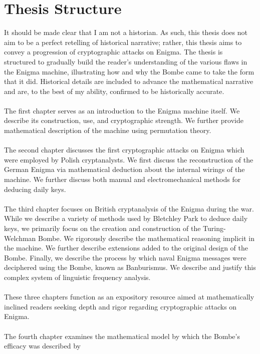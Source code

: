 \documentclass{dcthesis}
\theoremstyle{definition}
\theoremstyle{remark}
\begin{document}
\chapter*{Thesis Structure}
It should be made clear that I am not a historian. As such, this
thesis does not aim to be a perfect retelling of historical
narrative; rather, this thesis aims to convey a
progression of cryptographic attacks on Enigma. The thesis is
structured to gradually build the reader's
understanding of the various flaws in the Enigma machine,
illustrating how and why the Bombe came to take the form that it did.
Historical details are included to advance the mathematical narrative
and are, to the best of my ability, confirmed to be historically accurate.
\\\\The first chapter serves as an introduction to the Enigma machine itself. We describe its construction, use, and cryptographic strength. We further provide mathematical description of the machine using permutation theory. 
\\\\The second chapter discusses the first cryptographic attacks on Enigma which were employed by Polish cryptanalysts. We first discuss the reconstruction of the German Enigma via mathematical deduction about the internal wirings of the machine. We further discuss both manual and electromechanical methods for deducing daily keys. 
\\\\The third chapter focuses on British cryptanalysis of the Enigma during the war. While we describe a variety of methods used by Bletchley Park to deduce daily keys, we primarily focus on the creation and construction of the Turing-Welchman Bombe. We rigorously describe the mathematical reasoning implicit in the machine. We further describe extensions added to the original design of the Bombe. Finally, we describe the process by which naval Enigma messages were deciphered using the Bombe, known as Banburismus. We describe and justify this complex system of linguistic frequency analysis. 
\\\\These three chapters function as an expository
resource aimed at mathematically inclined readers seeking depth and rigor regarding cryptographic attacks on Enigma. 
\\\\The fourth chapter examines the
mathematical model by which the Bombe's efficacy was described by
\end{document}
